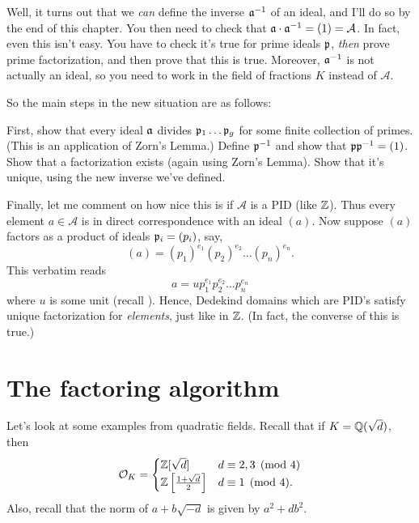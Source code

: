 Well, it turns out that we \emph{can} define the inverse $\mathfrak a^{-1}$ of an ideal,
and I'll do so by the end of this chapter.
You then need to check that $\mathfrak a \cdot \mathfrak a^{-1} = (1) = \mathcal A$.
In fact, even this isn't easy.
You have to check it's true for prime ideals $\mathfrak p$,
\emph{then} prove prime factorization,
and then prove that this is true.
Moreover, $\mathfrak a^{-1}$ is not actually an ideal, so you need to
work in the field of fractions $K$ instead of $\mathcal A$.

So the main steps in the new situation are as follows:
\begin{enumerate}[(1)]
	\ii First, show that every ideal $\mathfrak a$ divides $\mathfrak p_1 \dots \mathfrak p_g$
	for some finite collection of primes.
	(This is an application of Zorn's Lemma.)
	\ii Define $\mathfrak p^{-1}$ and show that $\mathfrak p \mathfrak p^{-1} = (1)$.
	\ii Show that a factorization exists (again using Zorn's Lemma).
	\ii Show that it's unique, using the new inverse we've defined.
\end{enumerate}

Finally, let me comment on how nice this is if $\mathcal A$ is a PID (like $\mathbb Z$).
Thus every element $a \in \mathcal A$ is in direct correspondence with an ideal $(a)$.
Now suppose $(a)$ factors as a product of ideals $\mathfrak p_i = (p_i)$, say,
\[ (a) = (p_1)^{e_1} (p_2)^{e_2} \dots (p_n)^{e_n} . \]
This verbatim reads \[ a = u p_1^{e_1} p_2^{e_2} \dots p_n^{e_n} \]
where $u$ is some unit (recall ).
Hence, Dedekind domains which are PID's satisfy unique factorization
for \emph{elements}, just like in $\mathbb Z$.
(In fact, the converse of this is true.)

\section{The factoring algorithm}
Let's look at some examples from quadratic fields.
Recall that if $K = \mathbb Q(\sqrt{d})$, then
\[
	\mathcal O_K =
	\begin{cases}
		\mathbb Z[\sqrt d] & d \equiv 2,3 \pmod 4 \\
		\mathbb Z\left[ \frac{1+\sqrt d}{2} \right] & d \equiv 1 \pmod 4.
	\end{cases}
\]
Also, recall that the norm of $a+b\sqrt{-d}$ is given by $a^2+db^2$.


